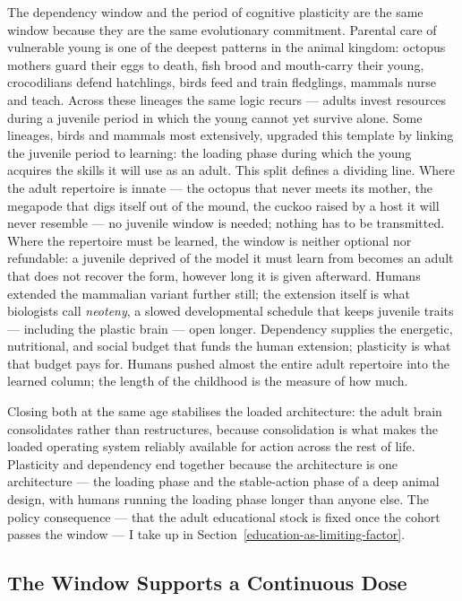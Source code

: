 \documentclass[12pt,letterpaper]{article}
\begin{document}
The dependency window and the period of cognitive plasticity are
the same window because they are the same evolutionary commitment.
Parental care of vulnerable young is one of the deepest patterns
in the animal kingdom: octopus mothers guard their eggs to death,
fish brood and mouth-carry their young, crocodilians defend
hatchlings, birds feed and train fledglings, mammals nurse and
teach. Across these lineages the same logic recurs --- adults
invest resources during a juvenile period in which the young
cannot yet survive alone. Some lineages, birds and mammals most
extensively, upgraded this template by linking the juvenile period
to learning: the loading phase during which the young acquires
the skills it will use as an adult. This split defines a dividing
line. Where the adult repertoire is innate --- the octopus that
never meets its mother, the megapode that digs itself out of the
mound, the cuckoo raised by a host it will never resemble --- no
juvenile window is needed; nothing has to be transmitted. Where the
repertoire must be learned, the window is neither optional nor
refundable: a juvenile deprived of the model it must learn from
becomes an adult that does not recover the form, however long it is
given afterward. Humans extended the mammalian
variant further still; the extension itself is what biologists
call \emph{neoteny}, a slowed developmental schedule that keeps
juvenile traits --- including the plastic brain --- open longer.
Dependency supplies the energetic, nutritional, and social budget
that funds the human extension; plasticity is what that budget
pays for. Humans pushed almost the entire adult repertoire into the
learned column; the length of the childhood is the measure of how
much.

Closing both at the same age stabilises the loaded
architecture: the adult brain consolidates rather than
restructures, because consolidation is what makes the loaded
operating system reliably available for action across the rest of
life. Plasticity and dependency end together because the
architecture is one architecture --- the loading phase and the
stable-action phase of a deep animal design, with humans running
the loading phase longer than anyone else. The policy consequence
--- that the adult educational stock is fixed once the cohort
passes the window --- I take up in
Section~\ref{education-as-limiting-factor}.

\subsection{The Window Supports a Continuous Dose}\label{the-window-supports-a-continuous-dose}
\end{document}
